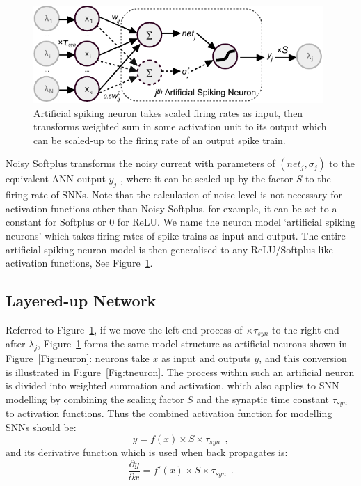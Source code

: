 \documentclass[runningheads,a4paper]{llncs}
\begin{document}
\begin{figure}[bt!]
	\centering
	\includegraphics[width=0.98\textwidth]{neuron_o.pdf}
	\caption{Artificial spiking neuron takes scaled firing rates as input, then transforms weighted sum in some activation unit to its output which can be scaled-up to the firing rate of an output spike train.}
	\label{Fig:sneuron}
\end{figure}

Noisy Softplus transforms the noisy current with parameters of $(net_j, \sigma_j)$ to the equivalent ANN output $y_j$ , where it can be scaled up by the factor $S$ to the firing rate of SNNs.
Note that the calculation of noise level is not necessary for activation functions other than Noisy Softplus, for example, it can be set to a constant for Softplus or 0 for ReLU.
We name the neuron model `artificial spiking neurons' which takes firing rates of spike trains as input and output. 
The entire artificial spiking neuron model is then generalised to any ReLU/Softplus-like activation functions, See Figure~\ref{Fig:sneuron}.




\subsection{Layered-up Network}
\label{subsec:ns_train}
Referred to Figure~\ref{Fig:sneuron}, if we move the left end process of $\times \tau_{syn}$ to the right end after $\lambda_j$, Figure~\ref{Fig:sneuron} forms the same model structure as artificial neurons shown in Figure~\ref{Fig:neuron}: neurons take $x$ as input and outputs $y$, and this conversion is illustrated in Figure~\ref{Fig:tneuron}.
The process within such an artificial neuron is divided into weighted summation and activation, which also applies to SNN modelling by combining the scaling factor $S$ and the synaptic time constant $\tau_{syn}$ to activation functions.
Thus the combined activation function for modelling SNNs should be:
\begin{equation}
y = f(x) \times S \times \tau_{syn}~~,
\label{equ:full_act}
\end{equation}
and its derivative function which is used when back propagates is:
\begin{equation}
\frac{\partial y}{\partial x} = f'(x) \times S \times \tau_{syn}~~.
\end{equation}
\end{document}
